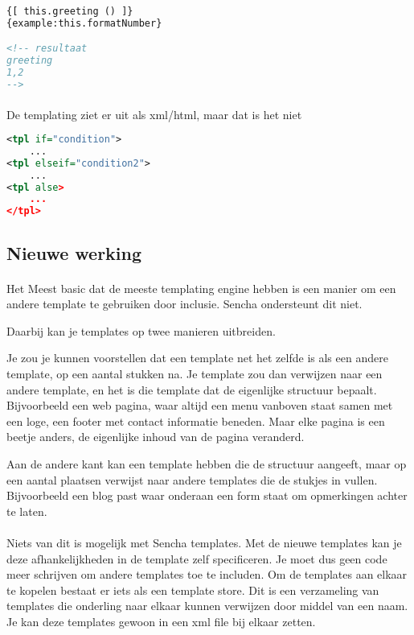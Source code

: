 \begin{lstlisting}[language=xml]
{[ this.greeting () ]}
{example:this.formatNumber}

<!-- resultaat
greeting
1,2
-->
\end{lstlisting}

\paragraph {} De templating ziet er uit als xml/html, maar dat is het niet

\begin{lstlisting}[language=xml]
<tpl if="condition">
	...
<tpl elseif="condition2">
	...
<tpl alse>
	...
</tpl>
\end{lstlisting}


\subsection {Nieuwe werking}

\paragraph {}Het Meest basic dat de meeste templating engine hebben is een manier om een
andere template te gebruiken door inclusie. Sencha ondersteunt dit niet.

Daarbij kan je templates op twee manieren uitbreiden.

Je zou je kunnen voorstellen dat een
template net het zelfde is als een andere template, op een aantal stukken na. Je template
zou dan verwijzen naar een andere template, en het is die template dat de eigenlijke
structuur bepaalt. Bijvoorbeeld een web pagina, waar altijd een menu vanboven staat samen
met een loge, een footer met contact informatie beneden. Maar elke pagina is een beetje
anders, de eigenlijke inhoud van de pagina veranderd.

Aan de andere kant kan een template hebben die de structuur aangeeft, maar op een aantal
plaatsen verwijst naar andere templates die de stukjes in vullen. Bijvoorbeeld een blog
past waar onderaan een form staat om opmerkingen achter te laten.

\paragraph {} Niets van dit is mogelijk met Sencha templates. Met de nieuwe templates kan
je deze afhankelijkheden in de template zelf specificeren. Je moet dus geen code meer
schrijven om andere templates toe te includen. Om de templates aan elkaar te kopelen
bestaat er iets als een template store. Dit is een verzameling van templates die onderling
naar elkaar kunnen verwijzen door middel van een naam. Je kan deze templates gewoon in een
xml file bij elkaar zetten.

